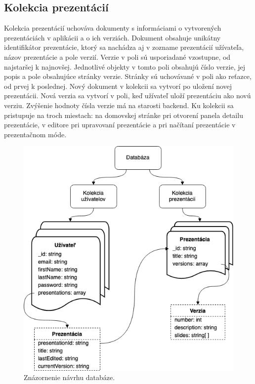 \subsection*{Kolekcia prezentácií}
Kolekcia prezentácií uchováva dokumenty s informáciami o vytvorených prezentáciách v aplikácii a o ich verziách. Dokument obsahuje unikátny identifikátor prezentácie, ktorý sa nachádza aj v zozname prezentácií užívateľa, názov prezentácie a pole verzií. Verzie v poli sú usporiadané vzostupne, od najstaršej k najnovšej. Jednotlivé objekty v tomto poli obsahujú číslo verzie, jej popis a pole obsahujúce stránky verzie. Stránky sú uchovávané v poli ako reťazce, od prvej k poslednej. Nový dokument v kolekcii sa vytvorí po uložení novej prezentácii. Nová verzia sa vytvorí v poli, keď užívateľ uloží prezentáciu ako novú verziu. Zvýšenie hodnoty čísla verzie má na starosti backend. Ku kolekcii sa pristupuje na troch miestach: na domovskej stránke pri otvorení panela detailu prezentácie, v editore pri upravovaní prezentácie a pri načítaní prezentácie v prezentačnom móde.

    \begin{figure}[!hbt]
        \centering
        \includegraphics[scale=0.5]{obrazky/databaza.png}
        \caption{Znázornenie návrhu databáze.}
        \label{pic:database}
    \end{figure}
    
